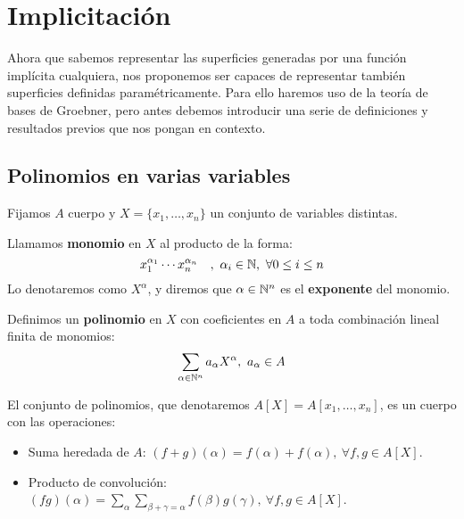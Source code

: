 
\chapter{Implicitación}
Ahora que sabemos representar las superficies generadas por una función implícita cualquiera, nos proponemos ser capaces de representar también superficies definidas paramétricamente. Para ello haremos uso de la teoría de bases de Groebner, pero antes debemos introducir una serie de definiciones y resultados previos que nos pongan en contexto.

\section{Polinomios en varias variables}
Fijamos $A$ cuerpo y $X=\{x_1, \dots, x_n\}$ un conjunto de variables distintas.

\begin{definicion}
    Llamamos \textbf{monomio} en $X$ al producto de la forma:
    $$x_1^{\alpha_1} \cdots x_n^{\alpha_n}\quad,\ \alpha_i \in \mathbb{N},\ \forall  0\le i \le n$$
    Lo denotaremos como $X^{\alpha}$, y diremos que $\alpha\in \mathbb{N}^n$ es el \textbf{exponente} del monomio.
\end{definicion}

\begin{definicion}
    Definimos un \textbf{polinomio} en $X$ con coeficientes en $A$ a toda combinación lineal finita de monomios: 
    \begin{equation*}
        \sum_{\alpha\in\Nn} a_{\alpha} X^{\alpha},\ a_\alpha \in A
    \end{equation*}
\end{definicion}

\begin{proposicion}
    El conjunto de polinomios, que denotaremos $A[X] = A[x_1,\dots, x_n]$, es un cuerpo con las operaciones:
    \begin{itemize}
        \item Suma heredada de $A$: $(f+g)(\alpha) = f(\alpha) + f(\alpha),\ \forall f,g\in A[X]$.
        \item Producto de convolución: $(fg)(\alpha) = \sum_{\alpha} \sum_{\beta+\gamma=\alpha} f(\beta)g(\gamma),\ \forall f,g\in A[X]$.
    \end{itemize}

\end{proposicion}

